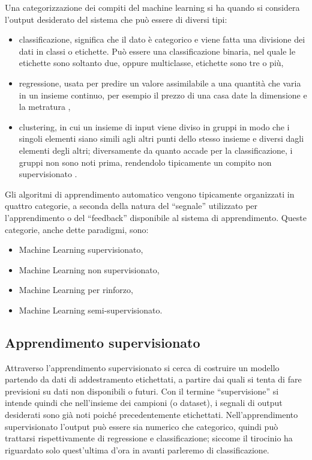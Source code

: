 \documentclass[12pt,italian]{report}
\begin{document}
Una categorizzazione dei compiti del machine learning si ha quando si considera l'output desiderato del sistema che può essere di diversi tipi:
\begin{itemize}
	\item classificazione, significa che il dato è categorico \cite{SupervisedMachineLearning} e viene fatta una divisione dei dati in classi o etichette. Può essere una classificazione binaria, nel quale le etichette sono soltanto due, oppure multiclasse, etichette sono tre o più,
	\item regressione, usata per predire un valore assimilabile a una quantità che varia in un insieme continuo, per esempio il prezzo di una casa date la dimensione e la metratura \cite{SupervisedMachineLearning},
	\item clustering, in cui un insieme di input viene diviso in gruppi in modo che i singoli elementi siano simili agli altri punti dello stesso insieme e diversi dagli elementi degli altri; diversamente da quanto accade per la classificazione, i gruppi non sono noti prima, rendendolo tipicamente un compito non supervisionato \cite{Introductiontodatamining}.
\end{itemize}
Gli algoritmi di apprendimento automatico vengono tipicamente organizzati in quattro categorie, a seconda della natura del ``segnale'' utilizzato per l'apprendimento o del ``feedback'' disponibile al sistema di apprendimento. Queste categorie, anche dette paradigmi, sono:
\begin{itemize}
	\item Machine Learning supervisionato,
	\item Machine Learning non supervisionato,
	\item Machine Learning per rinforzo,
	\item Machine Learning semi-supervisionato.
	
\end{itemize}

\subsection{Apprendimento supervisionato}
\label{apprendimentoSupervisionato}
Attraverso l’apprendimento supervisionato si cerca di costruire un modello partendo da dati di addestramento etichettati, a partire dai quali si tenta di fare previsioni su dati non disponibili o futuri. Con il termine ``supervisione'' si intende quindi che nell'insieme dei campioni (o dataset), i segnali di output desiderati sono già noti poiché precedentemente etichettati.
Nell'apprendimento supervisionato l'output può essere sia numerico che categorico, quindi può trattarsi rispettivamente di regressione e classificazione; siccome il tirocinio ha riguardato solo quest'ultima d'ora in avanti parleremo di classificazione.
\end{document}
